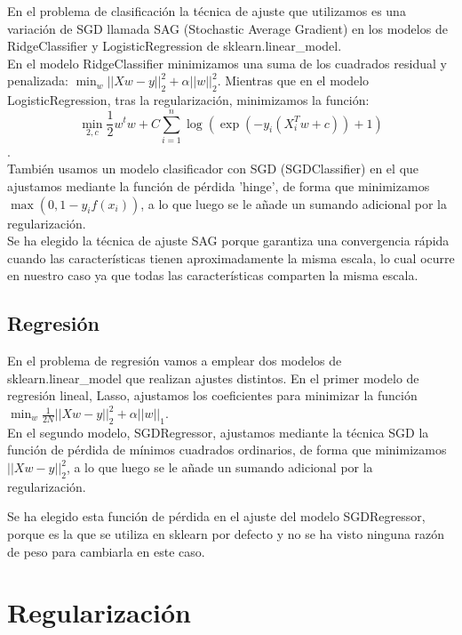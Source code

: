 \documentclass[12pt]{article}
\begin{document}
En el problema de clasificación la técnica de ajuste que utilizamos es una variación de SGD llamada SAG (Stochastic Average Gradient) en los modelos de RidgeClassifier y LogisticRegression de sklearn.linear\_model. \\

En el modelo RidgeClassifier minimizamos una suma de los cuadrados residual y penalizada: $\min_w ||Xw - y||_2^2 + \alpha||w||_2^2 $. Mientras que en el modelo LogisticRegression, tras la regularización, minimizamos la función:
$$\min_{2,c}\frac{1}{2}w^tw + C\sum_{i=1}^{n}\log(\exp(-y_i(X_i^Tw+c))+1)$$.\\

También usamos un modelo clasificador con SGD (SGDClassifier) en el que ajustamos mediante la función de pérdida 'hinge', de forma que minimizamos $\max(0,1-y_if(x_i))$, a lo que luego se le añade un sumando adicional por la regularización.\\

Se ha elegido la técnica de ajuste SAG porque garantiza una convergencia rápida cuando las características tienen aproximadamente la misma escala, lo cual ocurre en nuestro caso ya que todas las características comparten la misma escala.

\subsection{Regresión}

En el problema de regresión vamos a emplear dos modelos de sklearn.linear\_model que realizan ajustes distintos. En el primer modelo de regresión lineal, Lasso, ajustamos los coeficientes para minimizar la función $\min_{w} { \frac{1}{2N} ||X w - y||_2 ^ 2 + \alpha ||w||_1} $.\\

En el segundo modelo, SGDRegressor, ajustamos mediante la técnica SGD la función de pérdida de mínimos cuadrados ordinarios, de forma que minimizamos $||Xw - y||_2^2$, a lo que luego se le añade un sumando adicional por la regularización. 

Se ha elegido esta función de pérdida en el ajuste del modelo SGDRegressor, porque es la que se utiliza en sklearn por defecto y no se ha visto ninguna razón de peso para cambiarla en este caso.

\section{Regularización}
\end{document}
